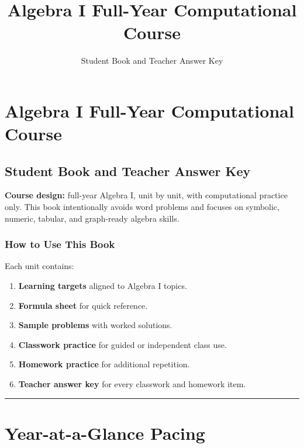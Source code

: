 \documentclass[11pt]{book}
\title{Algebra I Full-Year Computational Course}
\author{Student Book and Teacher Answer Key}
\date{}
\begin{document}
\maketitle
\tableofcontents
\clearpage
\chapter{Algebra I Full-Year Computational Course}

\section{Student Book and Teacher Answer Key}

\textbf{Course design:} full-year Algebra I, unit by unit, with computational practice only. This book intentionally avoids word problems and focuses on symbolic, numeric, tabular, and graph-ready algebra skills.

\subsection{How to Use This Book}

Each unit contains:

\begin{enumerate}
\item \textbf{Learning targets} aligned to Algebra I topics.
\item \textbf{Formula sheet} for quick reference.
\item \textbf{Sample problems} with worked solutions.
\item \textbf{Classwork practice} for guided or independent class use.
\item \textbf{Homework practice} for additional repetition.
\item \textbf{Teacher answer key} for every classwork and homework item.
\end{enumerate}

\bigskip\hrule\bigskip

\chapter{Year-at-a-Glance Pacing}
\end{document}
